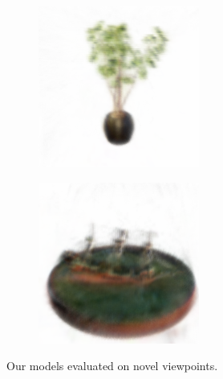 \documentclass{article}
\begin{document}
\begin{figure}[!h]
\begin{subfigure}{.24\textwidth}
\end{subfigure}
\begin{subfigure}{.24\textwidth}
  \centering
  \includegraphics[width=\linewidth]{figs/results/ficus.png}  
\end{subfigure}
\begin{subfigure}{.24\textwidth}
  \centering
  \includegraphics[width=\linewidth]{figs/results/ship.png}  
\end{subfigure}

     \caption{Our models evaluated on novel viewpoints.}
    \label{fig:results}
\end{figure}
\end{document}
